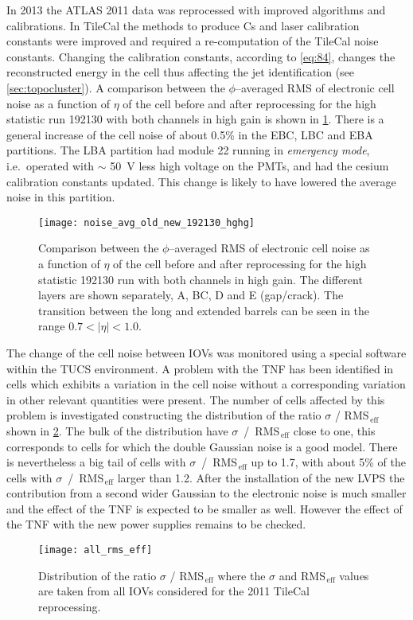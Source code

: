 In 2013 the ATLAS 2011 data was reprocessed with improved algorithms and
calibrations. In TileCal the methods to produce Cs and laser calibration
constants were improved and required a re-computation of the TileCal noise
constants. Changing the calibration constants, according to \cref{eq:84},
changes the reconstructed energy in the cell thus affecting the jet
identification (see \cref{sec:topocluster}). A comparison between the
$\phi$--averaged RMS of electronic cell noise as a function of $\eta$ of the
cell before and after reprocessing for the high statistic run 192130 with both
channels in high gain is shown in \cref{fig:noise_avg_old_new_hghg}. There is a
general increase of the cell noise of about 0.5\% in the EBC, LBC and EBA
partitions. The LBA partition had module 22 running in \emph{emergency mode},
i.e.\ operated with $\sim$ 50~V less high voltage on the PMTs, and had the
cesium calibration constants updated. This change is likely to have lowered the
average noise in this partition.

\begin{figure}[!h]
  \centering
    \texttt{[image: noise\_avg\_old\_new\_192130\_hghg]}
    \caption{Comparison between the $\phi$--averaged RMS of electronic cell
      noise as a function of $\eta$ of the cell before and after reprocessing
      for the high statistic 192130 run with both channels in high gain. The
      different layers are shown separately, A, BC, D and E (gap/crack). The
      transition between the long and extended barrels can be seen in the range
      $0.7 < |\eta| < 1.0$.}
    \label{fig:noise_avg_old_new_hghg}
\end{figure}

The change of the cell noise between IOVs was monitored using a special software
within the TUCS environment. A problem with the TNF has been identified in cells
which exhibits a variation in the cell noise without a corresponding variation
in other relevant quantities were present. The number of cells affected by this
problem is investigated constructing the distribution of the ratio $\sigma$ /
RMS$_\mathrm{\, eff}$ shown in \cref{fig:all_rms_eff}. The bulk of the
distribution have $\sigma$~/~RMS$_\mathrm{\, eff}$ close to one, this
corresponds to cells for which the double Gaussian noise is a good model. There
is nevertheless a big tail of cells with $\sigma$~/~RMS$_\mathrm{\, eff}$ up to
1.7, with about 5\% of the cells with $\sigma$~/~RMS$_\mathrm{\, eff}$ larger
than 1.2. After the installation of the new LVPS the contribution from a second
wider Gaussian to the electronic noise is much smaller and the effect of the TNF
is expected to be smaller as well. However the effect of the TNF with the new
power supplies remains to be checked.
\begin{figure}[!h]
  \centering
    \texttt{[image: all\_rms\_eff]}
    \caption{Distribution of the ratio $\sigma$ / RMS$_\mathrm{\, eff}$ where the
      $\sigma$ and RMS$_\mathrm{\, eff}$ values are taken from all IOVs
      considered for the 2011 TileCal reprocessing.}
    \label{fig:all_rms_eff}
\end{figure}
